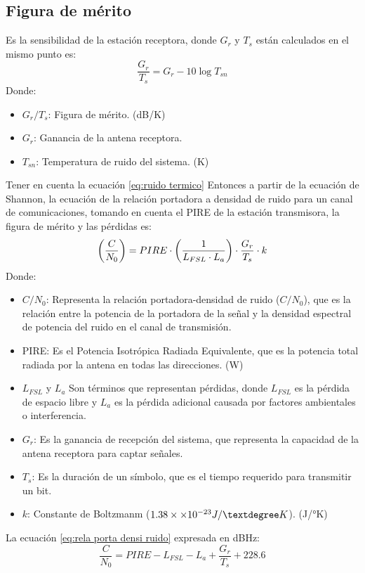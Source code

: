 \documentclass[
	12pt, %
	fleqn, %
	a4paper, %
	oneside, %
]{LegrandOrangeBook}
\begin{document}
\subsection{Figura de mérito}
Es la sensibilidad de la estación receptora, donde $G_r$ y $T_s$ están calculados en el mismo punto es:
\begin{equation}
\frac{G_r}{T_s}=G_r-10\log T_{sn}
\label{eq:figura merito}
\end{equation}
Donde:
\begin{itemize}
\item $G_r/T_s$: Figura de mérito. (dB/K)
\item $G_r$: Ganancia de la antena receptora.
\item $T_{sn}$: Temperatura de ruido del sistema. (K)
\end{itemize}
Tener en cuenta la ecuación \ref{eq:ruido termico}
Entonces a partir de la ecuación de Shannon, la ecuación de la relación
portadora a densidad de ruido para un canal de comunicaciones, tomando en cuenta el PIRE de la estación transmisora, la figura de mérito y las pérdidas es:
\begin{equation}
\left(\frac{C}{N_0}\right)=PIRE\cdot\left(\frac{1}{L_{FSL}\cdot L_a}\right)\cdot \frac{G_r}{T_s}\cdot k
\label{eq:rela porta densi ruido}
\end{equation}
Donde:
\begin{itemize}
\item $C/N_0$: Representa la relación portadora-densidad de ruido ($C/N_0$), que es la relación entre la potencia de la portadora de la señal y la densidad espectral de potencia del ruido en el canal de transmisión.
\item PIRE: Es el Potencia Isotrópica Radiada Equivalente, que es la potencia total radiada por la antena en todas las direcciones. (W)
\item $L_{FSL}$ y $L_a$ Son términos que representan pérdidas, donde 
$L_{FSL}$ es la pérdida de espacio libre y $L_a$ es la pérdida adicional causada por factores ambientales o interferencia.
\item $G_r$: Es la ganancia de recepción del sistema, que representa la capacidad de la antena receptora para captar señales.
\item $T_s$: Es la duración de un símbolo, que es el tiempo requerido para transmitir un bit.
\item $k$: Constante de Boltzmanm ($1.38\times\basedec{-23} J/°K$). (J/°K)
\end{itemize}
La ecuación \ref{eq:rela porta densi ruido} expresada en dBHz:
\begin{equation}
\frac{C}{N_0}=PIRE-L_{FSL}-L_a+\frac{G_r}{T_s}+228.6
\label{eq:densidad portadora ruido dBHz}
\end{equation}
\end{document}
